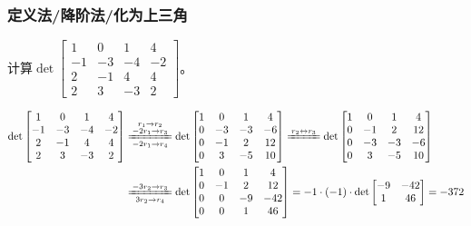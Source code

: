             \subsubsection{定义法/降阶法/化为上三角}

                \begin{example}
                    计算$\det \begin{bmatrix}1&0&1&4\\-1&-3&-4&-2\\2&-1&4&4\\2&3&-3&2\end{bmatrix}$。
                \end{example}

                \begin{solution}
                    \begin{equation*}
                        \begin{split}
                            \det \begin{bmatrix}1&0&1&4\\-1&-3&-4&-2\\2&-1&4&4\\2&3&-3&2\end{bmatrix}&\xlongequal[-2r_1\rightarrow r_4]{\substack{r_1\rightarrow r_2\\-2r_1\rightarrow r_3}}\det \begin{bmatrix}1&0&1&4\\0&-3&-3&-6\\0&-1&2&12\\0&3&-5&10\end{bmatrix}\xlongequal{r_2\leftrightarrow r_3}\det \begin{bmatrix}1&0&1&4\\0&-1&2&12\\0&-3&-3&-6\\0&3&-5&10\end{bmatrix} \\
                                                                                                     &\xlongequal[3r_2\rightarrow r_4]{-3r_2\rightarrow r_3}\det \begin{bmatrix}1&0&1&4\\0&-1&2&12\\0&0&-9&-42\\0&0&1&46\end{bmatrix}=-1\cdot(-1)\cdot \det\begin{bmatrix}-9&-42\\1&46\end{bmatrix}=-372
                        \end{split}
                    \end{equation*}
                \end{solution}

